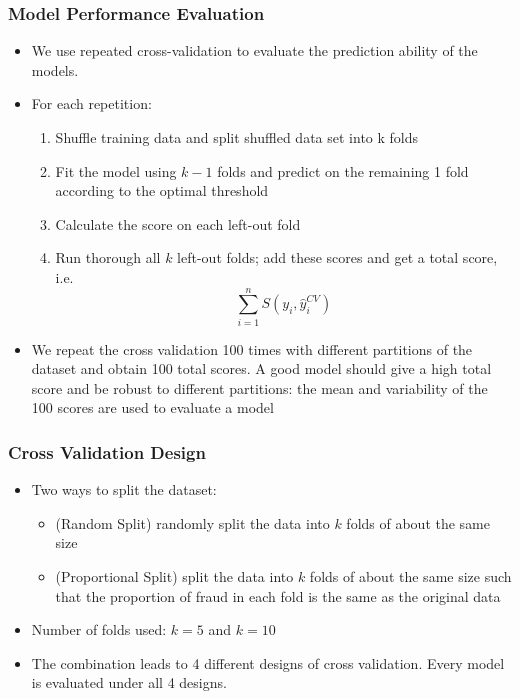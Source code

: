 \documentclass{beamer}
\begin{document}
\begin{frame}
\frametitle{Model Performance Evaluation}
\begin{itemize}
    \item We use repeated cross-validation to evaluate the prediction ability of the models.
    \item For each repetition:
    \begin{enumerate}
        \item Shuffle training data and split shuffled data set into k folds
        \item Fit the model using $k-1$ folds and predict on the remaining 1 fold according to the optimal threshold
        \item Calculate the score on each left-out fold
        \item Run thorough all $k$ left-out folds; add these scores and get a total score, i.e.
        \[\sum_{i=1}^n S(y_i, \hat{y}_i^{CV})\]
    \end{enumerate}
    \item We repeat the cross validation 100 times with different partitions of the dataset and obtain 100 total scores.
    A good model should give a high total score and be robust to different partitions: the mean and variability of the 100 scores are used to evaluate a model 
\end{itemize}
\end{frame}

\begin{frame}
\frametitle{Cross Validation Design}
\begin{itemize}
    \item Two ways to split the dataset:
    \begin{itemize}
        \item (Random Split) randomly split the data into $k$ folds of about the same size 
        \item (Proportional Split) split the data into $k$ folds of about the same size such that the proportion of fraud in each fold is the same as the original data
    \end{itemize}
    \item Number of folds used: $k = 5$ and $k = 10$
    \item The combination leads to 4 different designs of cross validation. Every model is evaluated under all 4 designs. 
\end{itemize}
\end{frame}
\end{document}
